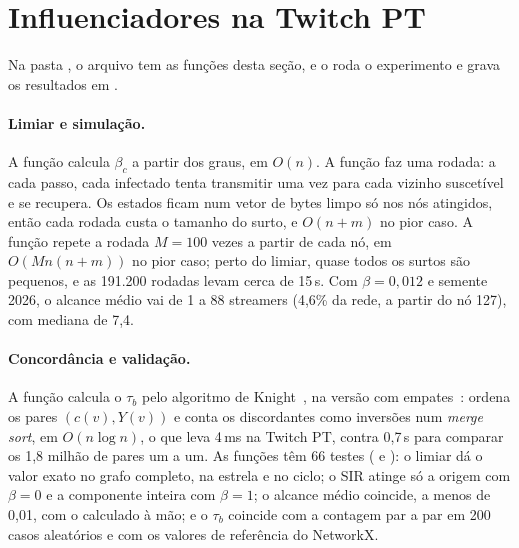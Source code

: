 \section{Influenciadores na Twitch PT}\label{sec:influenciadores}

Na pasta , o arquivo  tem as funções desta seção, e o
 roda o experimento e grava os resultados em .

\paragraph{Limiar e simulação.} A função  calcula $\beta_c$ a partir dos
graus, em $O(n)$. A função  faz uma rodada: a cada passo, cada infectado tenta
transmitir uma vez para cada vizinho suscetível e se recupera. Os estados ficam num vetor de bytes
limpo só nos nós atingidos, então cada rodada custa o tamanho do surto, e $O(n + m)$ no pior caso. A
função  repete a rodada $M = 100$ vezes a partir de cada nó, em
$O(M n (n + m))$ no pior caso; perto do limiar, quase todos os surtos são pequenos, e as 191.200
rodadas levam cerca de 15\,s. Com $\beta = 0{,}012$ e semente 2026, o alcance médio vai de 1 a 88
streamers (4,6\% da rede, a partir do nó 127), com mediana de 7,4.

\paragraph{Concordância e validação.} A função  calcula o $\tau_b$ pelo
algoritmo de Knight~\cite{knight1966}, na versão com empates~\cite{christensen2005}: ordena os pares
$(c(v), Y(v))$ e conta os discordantes como inversões num \emph{merge sort}, em $O(n \log n)$, o que
leva 4\,ms na Twitch PT, contra 0,7\,s para comparar os 1,8 milhão de pares um a um. As funções têm
66 testes ( e ): o limiar dá o valor exato no grafo completo, na
estrela e no ciclo; o SIR atinge só a origem com $\beta = 0$ e a componente inteira com $\beta = 1$;
o alcance médio coincide, a menos de 0,01, com o calculado à mão; e o $\tau_b$ coincide com a
contagem par a par em 200 casos aleatórios e com os valores de referência do NetworkX.

